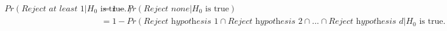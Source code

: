 \documentclass{article}
\newtheorem{corollary}{Corollary}[theorem]
\begin{document}
    \begin{align*}
        Pr(\textit{Reject at least } 1 | H_0 \text{ is true.}) &= 1 - Pr(\textit{Reject none} | H_0 \text{ is true}) \\
        &= 1 - Pr(\textit{Reject hypothesis 1} \cap \textit{Reject hypothesis 2} \cap ... \cap \textit{Reject hypothesis d} | H_0 \text{ is true.})
    \end{align*}


    
    
    
    
    
    
    
    
\end{document}
